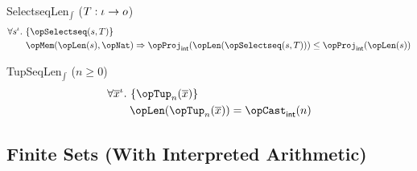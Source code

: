 \documentclass[11pt, a4paper, oneside]{article}
\begin{document}
\begin{axioms}
\item[SelectseqLen$_\int$ ($T : \iota \rightarrow o$)] \[
        \begin{aligned}
            &\forall s^\idv.\, \st{ \opSelectseq(s, T) } \\
            &\qquad \opMem(\opLen(s), \opNat) \imp \opProj_\int(\opLen(\opSelectseq(s, T))) \le \opProj_\int(\opLen(s))
        \end{aligned}
    \]

\item[TupSeqLen$_\int$ ($n \ge 0$)] \[
        \begin{aligned}
            &\forall \overline{x}^\idv.\, \st{ \opTup_n(\overline{x}) } \\
            &\qquad \opLen(\opTup_n(\overline{x})) = \opCast_\int(n)
        \end{aligned}
    \]

\end{axioms}


    \subsection{Finite Sets (With Interpreted Arithmetic)}
    \label{subsec:fsets_interpreted}
\end{document}
